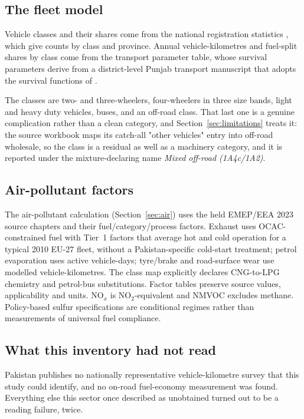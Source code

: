 \subsection{The fleet model}

Vehicle classes and their shares come from the national registration statistics
\citep{provregstats}, which give counts by class and province. Annual vehicle-kilometres
and fuel-split shares by class come from the transport parameter table, whose survival
parameters derive from a district-level Punjab transport manuscript \citep{naveedpunjab}
that adopts the survival functions of \citet{guttikunda2024}.

The classes are two- and three-wheelers, four-wheelers in three size bands, light and heavy
duty vehicles, buses, and an off-road class. That last one is a genuine complication rather
than a clean category, and Section~\ref{sec:limitations} treats it: the source workbook maps
its catch-all "other vehicles" entry into off-road wholesale, so the class is a residual as
well as a machinery category, and it is reported under the mixture-declaring name
\emph{Mixed off-road (1A4c/1A2)}.

\subsection{Air-pollutant factors}

The air-pollutant calculation (Section~\ref{sec:air}) uses the held EMEP/EEA 2023 source chapters and their fuel/category/process factors. Exhaust uses OCAC-constrained fuel with Tier~1 factors that average hot and cold operation for a typical 2010 EU-27 fleet, without a Pakistan-specific cold-start treatment; petrol evaporation uses active vehicle-days; tyre/brake and road-surface wear use modelled vehicle-kilometres. The class map explicitly declares CNG-to-LPG chemistry and petrol-bus substitutions. Factor tables preserve source values, applicability and units. NO$_x$ is NO$_2$-equivalent and NMVOC excludes methane. Policy-based sulfur specifications are conditional regimes rather than measurements of universal fuel compliance.

\subsection{What this inventory had not read}

Pakistan publishes no nationally representative vehicle-kilometre survey that this study
could identify, and no on-road fuel-economy measurement was found. Everything else this
sector once described as unobtained turned out to be a reading failure, twice.

